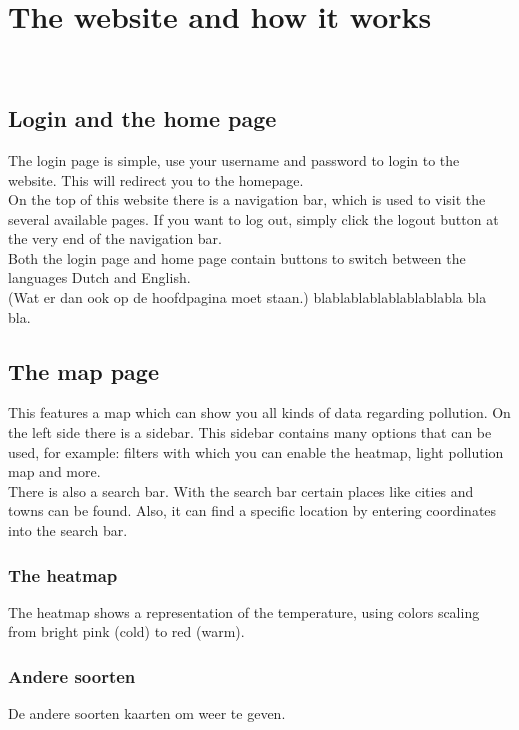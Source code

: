 \documentclass[a4paper]{article}
\begin{document}
\section{The website and how it works}
~\\

\subsection{Login and the home page}
The login page is simple, use your username and password to login to the website. This will redirect you to the homepage.
\\
\indent
On the top of this website there is a navigation bar, which is used to visit the several available pages.
If you want to log out, simply click the logout button at the very end of the navigation bar.
\\
\indent
Both the login page and home page contain buttons to switch between the languages Dutch and English.
\\
\indent
(Wat er dan ook op de hoofdpagina moet staan.) blablablablablablablabla bla bla.
~\\

\subsection{The map page}
This features a map which can show you all kinds of data regarding pollution. On the left side there is a sidebar. This sidebar contains many options that can be used, for example: filters with which you can enable the heatmap, light pollution map and more.
\\
\indent
There is also a search bar. With the search bar certain places like cities and towns can be found. Also, it can find a specific location by entering coordinates into the search bar.
~\\

\subsubsection{The heatmap}
The heatmap shows a representation of the temperature, using colors scaling from bright pink (cold) to red (warm).
~\\

\subsubsection{Andere soorten}
De andere soorten kaarten om weer te geven.
\end{document}
